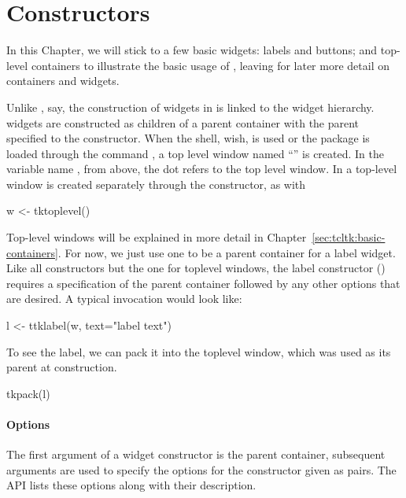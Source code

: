 
\section{Constructors}
\label{sec:tcltk:constructors}

In this Chapter, we will stick to a few basic widgets: labels and
buttons; and top-level containers to illustrate the basic usage of
, leaving for later more detail on containers and widgets.

Unlike \GTK, say, the construction of widgets in  is linked
to the widget hierarchy. \TK\/ widgets are constructed as children of
a parent container with the parent specified to the constructor. When
the \TK\/ shell, wish, is used or the \TK\/ package is loaded through
the \TCL\/ command , a top level window named
``'' is created. In the variable name , from
above, the dot refers to the top level window.  In  a
top-level window is created separately through the
 constructor, as with
\begin{Schunk}
\begin{Sinput}
 w <- tktoplevel()
\end{Sinput}
\end{Schunk}

Top-level windows will be explained in more detail in
Chapter~\ref{sec:tcltk:basic-containers}. For now, we just use one to
be a parent container for a label widget. Like all constructors but
the one for toplevel windows, the label constructor
() requires a specification of the parent
container followed by any other options that are desired. A typical
invocation would look like:
\begin{Schunk}
\begin{Sinput}
 l <- ttklabel(w, text="label text")
\end{Sinput}
\end{Schunk}

To see the label, we can pack it into the toplevel window, which was
used as its parent at construction.
\begin{Schunk}
\begin{Sinput}
 tkpack(l)
\end{Sinput}
\end{Schunk}

\paragraph{Options}
The first argument of a widget constructor is the parent container,
subsequent arguments are used to specify the options for the
constructor given as  pairs. The \TK\/ API lists these
options along with their description.

